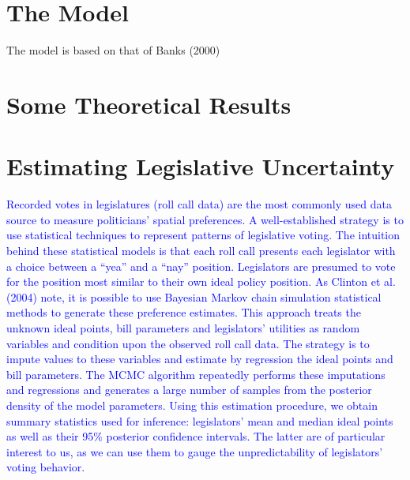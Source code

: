 \documentclass[12pt]{article}
\newcommand{\ga}{\gamma}
\begin{document}


\section{The Model}
\label{sec:model}

The model is based on that of Banks (2000)


\section{Some Theoretical Results}
\label{sec:res}

\section{Estimating Legislative Uncertainty}
\label{sec:est}

\textcolor{blue}{Recorded votes in legislatures (roll call data) are the most commonly used data source to measure politicians' spatial preferences. A well-established strategy is to use statistical techniques to represent patterns of legislative voting. The intuition behind these statistical models is that each roll call presents each legislator with a choice between a ``yea'' and a ``nay'' position. Legislators are presumed to vote for the position most similar to their own ideal policy position. As Clinton et al. (2004) note, it is possible to use Bayesian Markov chain simulation statistical methods to generate these preference estimates. This approach treats the unknown ideal points, bill parameters and legislators' utilities as random variables and condition upon the observed roll call data. The strategy is to impute values to these variables and estimate by regression the ideal points and bill parameters. The MCMC algorithm repeatedly performs these imputations and regressions and generates a large number of samples from the posterior density of the model parameters. Using this estimation procedure, we obtain summary statistics used for inference: legislators' mean and median ideal points as well as their 95$\%$ posterior confidence intervals. The latter are of particular interest to us, as we can use them to gauge the unpredictability of  legislators' voting behavior.}
\end{document}
